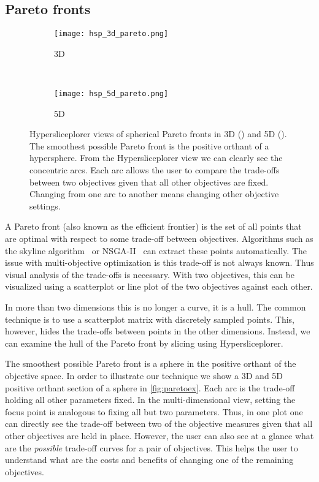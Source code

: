 \subsection{Pareto fronts}
\label{sec:pareto}

\begin{figure} 
  \centering
  \begin{subfigure}[b]{0.45\linewidth}
    \texttt{[image: hsp\_3d\_pareto.png]}
    \caption{3D}
    \label{fig:pareto:3d} 
  \end{subfigure} 
  ~
  \begin{subfigure}[b]{0.45\linewidth}
    \texttt{[image: hsp\_5d\_pareto.png]}
    \caption{5D}
    \label{fig:pareto:5d} 
  \end{subfigure}
  \caption{%
    Hypersliceplorer views of spherical Pareto fronts in 3D 
    () and 5D (). 
    The smoothest possible Pareto front is the positive orthant of a 
    hypersphere.  From
    the Hypersliceplorer view we can clearly see the concentric arcs. Each
    arc allows the user to compare the trade-offs between two objectives 
    given that all other objectives are fixed. Changing from one arc to 
    another means changing other objective settings.
  }
  \label{fig:paretoex}
\end{figure}

A Pareto front (also
known as the efficient frontier) is the set of all points that are optimal with
respect to some trade-off between objectives. Algorithms such as the skyline
algorithm~\cite{Borzsony:2001} or NSGA-II~\cite{Deb:2002} can extract these
points automatically. The issue with multi-objective optimization is this
trade-off is not always known. Thus visual analysis of the trade-offs is
necessary. With two objectives, this can be visualized using a scatterplot or
line plot of the two objectives against each other. 

In more than two dimensions this is no longer a curve, it is a hull. The common
technique is to use a scatterplot matrix with discretely sampled points. This, however, hides the trade-offs between
points in the other dimensions. Instead, we can examine the hull of the 
Pareto front by slicing using Hypersliceplorer.

The smoothest possible Pareto front is a sphere in the positive orthant of the objective
space. In order to illustrate our technique we show a 3D and 5D
positive orthant section of a sphere in \autoref{fig:paretoex}.  Each arc is
the trade-off holding all other parameters fixed.  In the multi-dimensional
view, setting the focus point is analogous to fixing all but two parameters.
Thus, in one plot one can directly see the trade-off between two of the 
objective measures given that all other objectives are held in place. However,
the user can also see at a glance what are the \emph{possible} trade-off curves
for a pair of objectives. This helps the user to understand what are the costs
and benefits of changing one of the remaining objectives.

